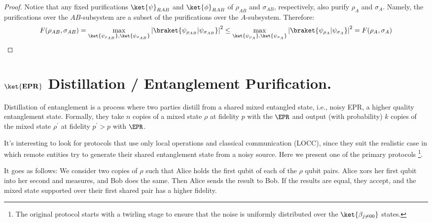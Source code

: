 \documentclass[12pt,a4paper]{article}
\begin{document}
\begin{proof}

Notice that any fixed purifications $\ket{\psi}_{RAB}$ and $\ket{\phi}_{RAB}$ of $\rho_{AB}$ and $\sigma_{AB}$, respectively, also purify $\rho_A$ and $\sigma_A$. Namely, the purifications over the $AB$-subsystem are a subset of the purifications over the $A$-subsystem. Therefore:
  \begin{equation*}
    \begin{split}
      F(\rho_{AB}, \sigma_{AB}) = \max_{\ket{\psi_{\rho_{AB}}}, \ket{\psi_{\sigma_{AB}}}} \left| \braket{\psi_{\rho_{AB}}|\psi_{\sigma_{AB}}} \right|^2  \le \max_{\ket{\psi_{\rho_{A}}}, \ket{\psi_{\sigma_{A}}}} \left| \braket{\psi_{\rho_{A}}|\psi_{\sigma_{A}}} \right|^2 =F(\rho_{A}, \sigma_{A})
    \end{split}
  \end{equation*}
\end{proof}


\section{ $ \ket{\mathbf{EPR} }$ Distillation / Entanglement Purification.  }
Distillation of entanglement is a process where two parties distill from a shared mixed entangled state, i.e., noisy EPR, a higher quality entanglement state. Formally, they take $n$ copies of a mixed state $\rho$ at fidelity $p$ with the $\EPR$ and output (with probability) $k$ copies of the mixed state $\rho^{\prime}$ at fidelity $p^\prime > p$ with $\EPR$. 

It's interesting to look for protocols that use only local operations and classical communication (LOCC), since they suit the realistic case in which remote entities try to generate their shared entanglement state from a noisy source. Here we present one of the primary protocols \cite{Bennett_1996}\footnote{The original protocol starts with a twirling stage to ensure that the noise is uniformly distributed over the $\ket{\beta_{j \neq 00}}$ states.}.

It goes as follows: We consider two copies of $\rho$ such that Alice holds the first qubit of each of the $\rho$ qubit pairs. Alice xors her first qubit into her second and measures, and Bob does the same. Then Alice sends the result to Bob. If the results are equal, they accept, and the mixed state supported over their first shared pair has a higher fidelity.
\end{document}
